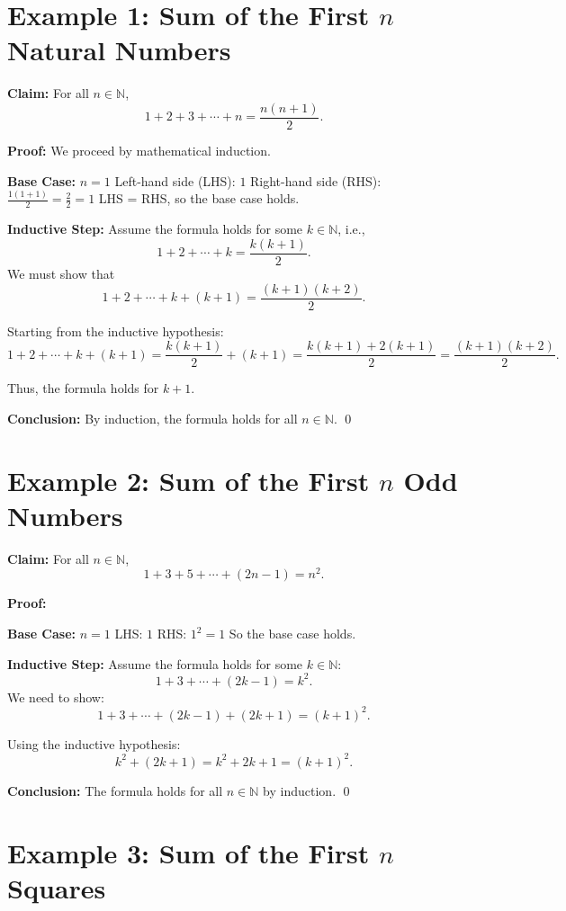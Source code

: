 \documentclass{article}
\begin{document}
\section*{Example 1: Sum of the First $n$ Natural Numbers}

\textbf{Claim:} For all $n \in \mathbb{N}$,
\[
    1 + 2 + 3 + \cdots + n = \frac{n(n+1)}{2}.
\]

\textbf{Proof:}
We proceed by mathematical induction.

\textbf{Base Case:} $n = 1$
Left-hand side (LHS): $1$
Right-hand side (RHS): $\frac{1(1+1)}{2} = \frac{2}{2} = 1$
LHS = RHS, so the base case holds.

\textbf{Inductive Step:}
Assume the formula holds for some $k \in \mathbb{N}$, i.e.,
\[
    1 + 2 + \cdots + k = \frac{k(k+1)}{2}.
\]
We must show that
\[
    1 + 2 + \cdots + k + (k+1) = \frac{(k+1)(k+2)}{2}.
\]

Starting from the inductive hypothesis:
\[
    1 + 2 + \cdots + k + (k+1) = \frac{k(k+1)}{2} + (k+1)
    = \frac{k(k+1) + 2(k+1)}{2} = \frac{(k+1)(k + 2)}{2}.
\]

Thus, the formula holds for $k+1$.

\textbf{Conclusion:} By induction, the formula holds for all $n \in \mathbb{N}$.
\qed

\section*{Example 2: Sum of the First $n$ Odd Numbers}

\textbf{Claim:} For all $n \in \mathbb{N}$,
\[
    1 + 3 + 5 + \cdots + (2n - 1) = n^2.
\]

\textbf{Proof:}

\textbf{Base Case:} $n = 1$
LHS: $1$
RHS: $1^2 = 1$
So the base case holds.

\textbf{Inductive Step:}
Assume the formula holds for some $k \in \mathbb{N}$:
\[
    1 + 3 + \cdots + (2k - 1) = k^2.
\]
We need to show:
\[
    1 + 3 + \cdots + (2k - 1) + (2k + 1) = (k + 1)^2.
\]

Using the inductive hypothesis:
\[
    k^2 + (2k + 1) = k^2 + 2k + 1 = (k + 1)^2.
\]

\textbf{Conclusion:} The formula holds for all $n \in \mathbb{N}$ by induction.
\qed

\section*{Example 3: Sum of the First $n$ Squares}
\end{document}
